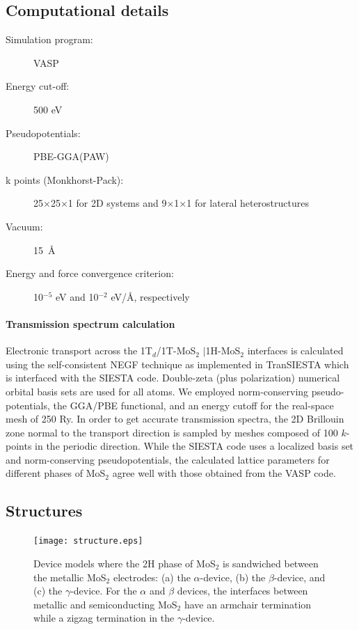 \subsection{Computational details}


\begin{footnotesize}
\begin{description}
\item[Simulation program:] VASP
\item[Energy cut-off:] 500 eV
\item[Pseudopotentials:] PBE-GGA(PAW)
\item[k points (Monkhorst-Pack):] 25$\times$25$\times$1 for 2D systems and 9$\times$1$\times$1 for lateral heterostructures
\item[Vacuum:] 15~\AA
\item[Energy and force convergence criterion:] 10$^{-5}$ eV and 10$^{-2}$ eV/\AA, respectively
\end{description}
\end{footnotesize}


\paragraph{Transmission spectrum calculation} Electronic transport across the 1T$_d$/1T-MoS$_2$ $\mid$1H-MoS$_2$ interfaces is calculated using the self-consistent NEGF technique as implemented in TranSIESTA\cite{transiesta} which is interfaced with the SIESTA code.\cite{siesta} Double-zeta (plus polarization) numerical orbital basis sets are used for all atoms. We employed norm-conserving pseudo-potentials\cite{tm}, the GGA/PBE functional, and an energy cutoff for the real-space mesh of 250 Ry.  In order to get accurate transmission spectra, the 2D Brillouin zone normal to the transport direction is sampled by meshes composed of  100 $k$-points in the periodic direction. While the SIESTA code uses a localized basis set and norm-conserving pseudopotentials, the calculated lattice parameters for different phases of MoS$_2$ agree well with those obtained from the VASP code. 


\subsection{Structures}

\begin{figure}[htb]
\centering
\texttt{[image: structure.eps]}%
\caption{\label{structure-1t}  Device models where the 2H phase of MoS$_2$ is sandwiched between the metallic MoS$_2$ electrodes: (a) the $\alpha$-device, (b) the $\beta$-device, and (c)
the $\gamma$-device. For the $\alpha$ and $\beta$ devices, 
the interfaces between metallic and semiconducting MoS$_2$ have an armchair termination while a zigzag termination in the $\gamma$-device. }
\end{figure}

